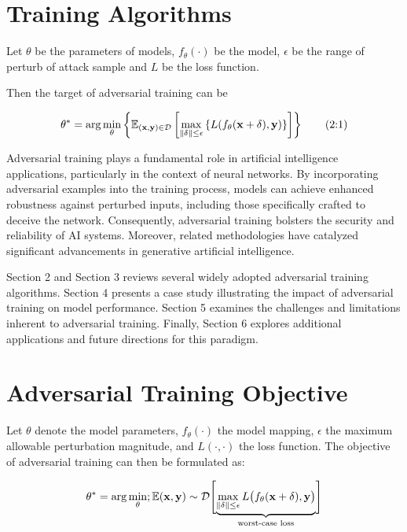 \documentclass[10pt,twocolumn,letterpaper]{article}
\begin{document}
\section{Training Algorithms}
Let $\theta$ be the parameters of models, $f_\theta(\cdot)$ be the model, $\epsilon$ be the range of perturb of attack sample and $L$ be the loss function.

Then the target of adversarial training can be

\begin{equation}
\theta^*=\arg\min_\theta\left\{
  \mathbb{E}_{(\bf{x}, \bf{y})\in \mathcal{D}}
  \left[
      \max_{\lVert\bf{\delta}\rVert\leq \epsilon}
          \left\{L(f_\theta(\bf{x}+\delta), y)\right\}
  \right]
\right\}
\tag{2:1}
\label{formula:adversarial_target}
\end{equation}

Adversarial training plays a fundamental role in artificial intelligence applications, particularly in the context of neural networks. By incorporating adversarial examples into the training process, models can achieve enhanced robustness against perturbed inputs, including those specifically crafted to deceive the network. Consequently, adversarial training bolsters the security and reliability of AI systems. Moreover, related methodologies have catalyzed significant advancements in generative artificial intelligence.

Section 2 and Section 3 reviews several widely adopted adversarial training algorithms. Section 4 presents a case study illustrating the impact of adversarial training on model performance. Section 5 examines the challenges and limitations inherent to adversarial training. Finally, Section 6 explores additional applications and future directions for this paradigm.

\section{Adversarial Training Objective}
Let $\theta$ denote the model parameters, $f_{\theta}(\cdot)$ the model mapping, $\epsilon$ the maximum allowable perturbation magnitude, and $L(\cdot,\cdot)$ the loss function. The objective of adversarial training can then be formulated as:

\begin{equation}
\theta^{*} = \arg\min_{\theta} ; \mathbb{E}{(\bf{x},\bf{y}) \sim \mathcal{D}} \Biggl[\underbrace{\max_{{\lVert \bf{\delta} \rVert \le \epsilon}} L\bigl(f_{\theta}(\bf{x} + \bf{\delta}), \bf{y}\bigr)}_{\text{worst-case loss}}\Biggr]
\label{eq:adv_training_objective}
\end{equation}
\end{document}
